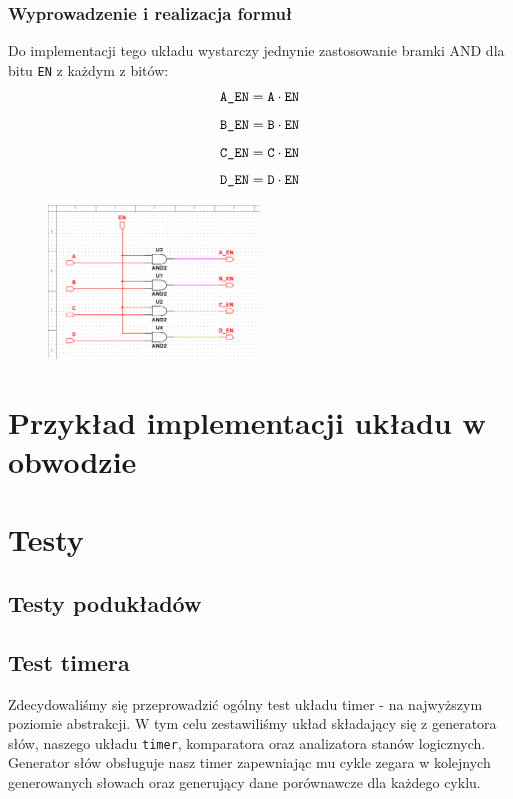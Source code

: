 \documentclass[a4paper]{article}
\begin{document}
\begin{center}
\begin{tabular}{|l|l|l|l|l||l|l|l|l|}
    \end{tabular}
    \end{center}


    \subsubsection{Wyprowadzenie i realizacja formuł}
    Do implementacji tego układu wystarczy jednynie zastosowanie bramki AND dla bitu \verb|EN| z każdym z bitów:
    \[\verb|A_EN| = \verb|A| \cdot \verb|EN| \]
    \[\verb|B_EN| = \verb|B| \cdot \verb|EN| \]
    \[\verb|C_EN| = \verb|C| \cdot \verb|EN| \]
    \[\verb|D_EN| = \verb|D| \cdot \verb|EN| \]
\begin{figure}[H]
    \centering
    \includegraphics[width=0.5\textwidth]{enabler.png}
\end{figure}


\section{Przykład implementacji układu w obwodzie}

\pagebreak
\section{Testy}
\subsection{Testy podukładów}
\subsection{Test timera}
Zdecydowaliśmy się przeprowadzić ogólny test układu timer - na najwyższym poziomie abstrakcji.
W tym celu zestawiliśmy układ składający się z generatora słów, naszego układu \verb|timer|, komparatora oraz analizatora
stanów logicznych. Generator słów obsługuje nasz timer zapewniając mu cykle zegara w kolejnych 
generowanych słowach oraz generujący dane porównawcze dla każdego cyklu.
\end{document}
